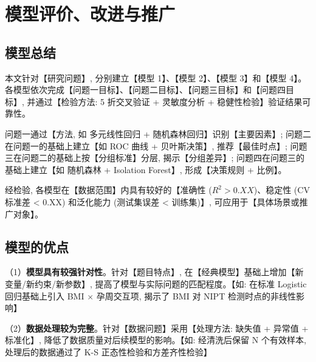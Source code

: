 
\section{模型评价、改进与推广}

\subsection{模型总结}

本文针对【研究问题】, 分别建立【模型 1】、【模型 2】、【模型 3】和【模型 4】。各模型依次完成【问题一目标】、【问题二目标】、【问题三目标】和【问题四目标】, 并通过【检验方法: 5 折交叉验证 + 灵敏度分析 + 稳健性检验】验证结果可靠性。

问题一通过【方法, 如 多元线性回归 + 随机森林回归】识别【主要因素】; 问题二在问题一的基础上建立【如 ROC 曲线 + 贝叶斯决策】, 推荐【最佳时点】; 问题三在问题二的基础上按【分组标准】分层, 揭示【分组差异】; 问题四在问题三的基础上建立【如 随机森林 + Isolation Forest】, 形成【决策规则 + 比例】。

经检验, 各模型在【数据范围】内具有较好的【准确性 ($R^2 > 0.XX$)、稳定性 (CV 标准差 < 0.XX) 和泛化能力 (测试集误差 < 训练集)】, 可应用于【具体场景或推广对象】。

\subsection{模型的优点}

（1）\textbf{模型具有较强针对性}。针对【题目特点】, 在【经典模型】基础上增加【新变量/新约束/新参数】, 提高了模型与实际问题的匹配程度。【如: 在标准 Logistic 回归基础上引入 BMI $\times$ 孕周交互项, 揭示了 BMI 对 NIPT 检测时点的非线性影响】

（2）\textbf{数据处理较为完整}。针对【数据问题】采用【处理方法: 缺失值 + 异常值 + 标准化】, 降低了数据质量对后续模型的影响。【如: 经清洗后保留 N 个有效样本, 处理后的数据通过了 K-S 正态性检验和方差齐性检验】

